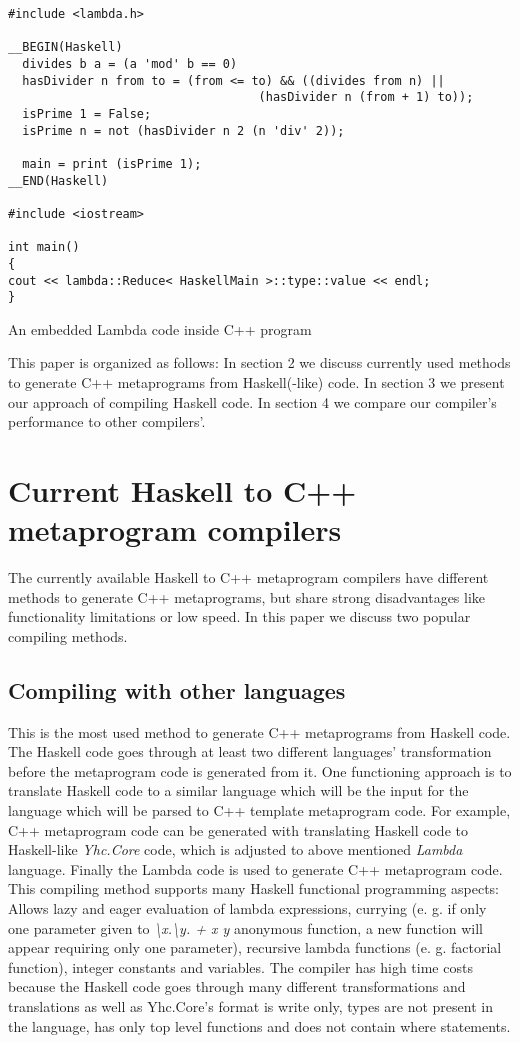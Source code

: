 \documentclass{article}
\begin{document}
\begin{center}
\begin{lstlisting}
#include <lambda.h>

__BEGIN(Haskell)
  divides b a = (a 'mod' b == 0)
  hasDivider n from to = (from <= to) && ((divides from n) ||
                                   (hasDivider n (from + 1) to));
  isPrime 1 = False;
  isPrime n = not (hasDivider n 2 (n 'div' 2));

  main = print (isPrime 1);
__END(Haskell)

#include <iostream>

int main()
{
cout << lambda::Reduce< HaskellMain >::type::value << endl;
}
\end{lstlisting}
An embedded Lambda\cite{porkolab2009functional} code inside C++ program
\end{center}
This paper is organized as follows: In section 2 we discuss currently used methods to generate C++ metaprograms from Haskell(-like) code. In section 3 we present our approach of compiling Haskell code. In section 4 we compare our compiler's performance to other compilers'.
\section{Current Haskell to C++ metaprogram compilers}
The currently available Haskell to C++ metaprogram compilers have different methods to generate C++ metaprograms, but share strong disadvantages like functionality limitations or low speed. In this paper we discuss two popular compiling methods.
\subsection{Compiling with other languages}
This is the most used method to generate C++ metaprograms from Haskell code. The Haskell code goes through at least two different languages' transformation before the metaprogram code is generated from it. One functioning approach is to translate Haskell code to a similar language which will be the input for the language which will be parsed to C++ template metaprogram code. For example, C++ metaprogram code can be generated with translating Haskell code to Haskell-like \textit{Yhc.Core} code, which is adjusted to above mentioned \textit{Lambda} language. Finally the Lambda code is used to generate C++ metaprogram code.\cite{porkolab2009c++} This compiling method supports many Haskell functional programming aspects: Allows lazy and eager evaluation of lambda expressions, currying (e. g. if only one parameter given to \textit{\textbackslash x.\textbackslash y. + x y} anonymous function, a new function will appear requiring only one parameter), recursive lambda functions (e. g. factorial function), integer constants and variables. The compiler has high time costs because the Haskell code goes through many different transformations and translations as well as Yhc.Core's format is write only, types are not present in the language, has only top level functions and does not contain where statements.\cite{yhc}
\end{document}

